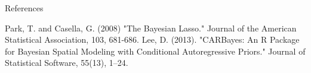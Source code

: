 \begin{frame}{References}
    \begin{thebibliography}{} 
        Park, T. and Casella, G. (2008) "The Bayesian Lasso." Journal of the American Statistical Association, 103, 681-686.
        Lee, D. (2013). "CARBayes: An R Package for Bayesian Spatial Modeling with Conditional Autoregressive Priors." Journal of Statistical Software, 55(13), 1–24.
    \end{thebibliography}
\end{frame}